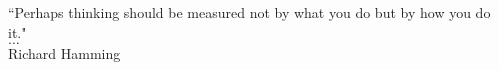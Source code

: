\begin{center}
    ``Perhaps thinking should be measured not by what you do but by how you do it." \\$\dots$\\ Richard Hamming
\end{center}